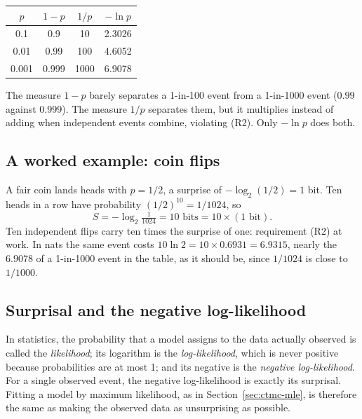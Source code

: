 \begin{center}
\begin{tabular}{cccc}
\toprule
$p$ & $1-p$ & $1/p$ & $-\ln p$ \\
\midrule
0.1   & 0.9   & 10   & 2.3026 \\
0.01  & 0.99  & 100  & 4.6052 \\
0.001 & 0.999 & 1000 & 6.9078 \\
\bottomrule
\end{tabular}
\end{center}

\noindent The measure $1-p$ barely separates a 1-in-100 event from a 1-in-1000 event
($0.99$ against $0.999$). The measure $1/p$ separates them, but it multiplies instead of adding
when independent events combine, violating (R2). Only $-\ln p$ does both.

\subsection{A worked example: coin flips}
A fair coin lands heads with $p = 1/2$, a surprise of $-\log_2(1/2) = 1$ bit. Ten heads in a
row have probability $(1/2)^{10} = 1/1024$, so
\[
S = -\log_2 \tfrac{1}{1024} = 10 \text{ bits} = 10 \times (1 \text{ bit}).
\]
Ten independent flips carry ten times the surprise of one: requirement (R2) at work. In nats
the same event costs $10 \ln 2 = 10 \times 0.6931 = 6.9315$, nearly the $6.9078$ of a
1-in-1000 event in the table, as it should be, since $1/1024$ is close to $1/1000$.

\subsection{Surprisal and the negative log-likelihood}
In statistics, the probability that a model assigns to the data actually observed is called
the \emph{likelihood}; its logarithm is the \emph{log-likelihood}, which is never positive
because probabilities are at most 1; and its negative is the \emph{negative log-likelihood}.
For a single observed event, the negative log-likelihood is exactly its surprisal. Fitting a
model by maximum likelihood, as in Section~\ref{sec:ctmc-mle}, is therefore the same as making
the observed data as unsurprising as possible.

